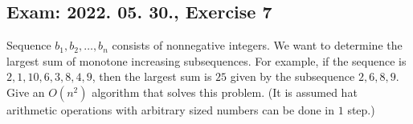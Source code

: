 \subsection{Exam: 2022. 05. 30., Exercise 7}


Sequence $b_1,b_2,\dots{},b_n$ consists of nonnegative integers. We want to
determine the largest sum of monotone increasing subsequences. For example, if
the sequence is $2,1,10,6,3,8,4,9$, then the largest sum is $25$ given by
the subsequence $2,6,8,9$. Give an $O(n^2)$ algorithm that solves this problem.
(It is assumed hat arithmetic operations with arbitrary sized numbers can be
done in $1$ step.)



